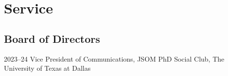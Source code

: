 \documentclass[11pt,letterpaper]{report} %
\begin{document}
    \section*{Service}

   \subsection*{Board of Directors}

   \begin{tablist}

       \item[2023--24]    \tab{}Vice President of Communications, JSOM PhD Social Club, The University of Texas at Dallas 

   \end{tablist}









\end{document}
